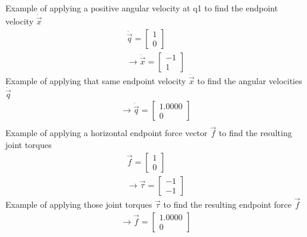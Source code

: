 \documentclass[11pt]{amsart}
\begin{document}
\noindent
Example of applying a positive angular velocity at q1 to find the endpoint velocity $\dot{\vec{x}}$
\begin{align*}
\dot{\vec{q}} =\left[\begin{array}{r}
	1 \\
	 0
	 \end{array}\right] \\
 \to \dot{\vec{x}} =\left[\begin{array}{r}
	    -1\\
	     1
	\end{array}\right]
\end{align*}
\noindent
Example of applying that same endpoint velocity $\dot{\vec{x}}$ to find the angular velocities $\dot{\vec{q}}$
\begin{align*}
\to \dot{\vec{q}} =\left[\begin{array}{r}
    1.0000\\
         0
\end{array}\right] \\
\end{align*}
\noindent
Example of applying a horizontal endpoint force vector $\vec{f}$ to find the resulting joint torques
\begin{align*}
\vec{f} =\left[\begin{array}{r}
	1 \\
	 0
	 \end{array}\right] \\
\to \vec{\tau} =\left[\begin{array}{r}
	    -1\\
	    -1
	\end{array}\right]
\end{align*}
\noindent	 
Example of applying those joint torques $\vec{\tau}$ to find the resulting endpoint force $\vec{f}$
\begin{align*}
\to \vec{f} =\left[\begin{array}{r}
	    1.0000\\
	         0
	\end{array}\right]
\end{align*}
\end{document}
